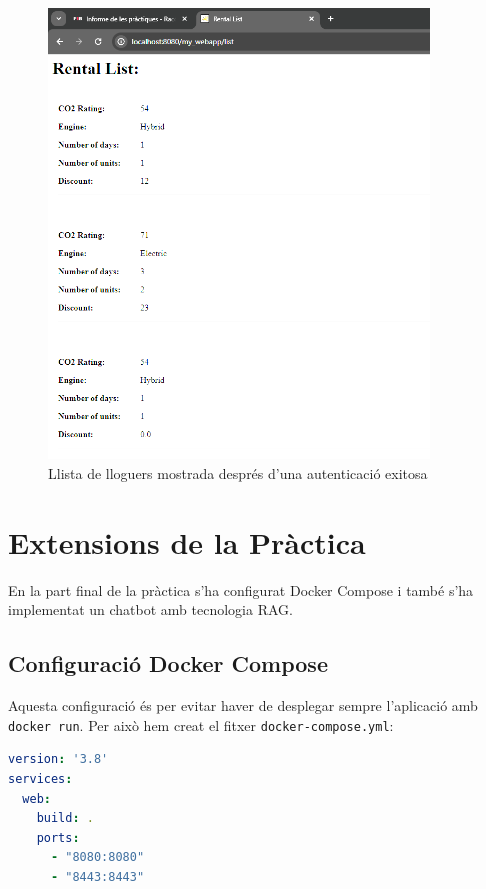 \documentclass[12pt,a4paper]{article}
\begin{document}
\begin{figure}[H]
\centering
\includegraphics[width=0.9\textwidth]{img/rental_list.png}
\caption{Llista de lloguers mostrada després d'una autenticació exitosa}
\end{figure}

\newpage
\section{Extensions de la Pràctica}

En la part final de la pràctica s'ha configurat Docker Compose i també s'ha implementat un chatbot amb tecnologia RAG.

\subsection{Configuració Docker Compose}

Aquesta configuració és per evitar haver de desplegar sempre l'aplicació amb \texttt{docker run}. Per això hem creat el fitxer \texttt{docker-compose.yml}:

\begin{lstlisting}[language=YAML,caption=Configuració Docker Compose]
version: '3.8'
services:
  web:
    build: .
    ports:
      - "8080:8080"
      - "8443:8443"
\end{lstlisting}
\end{document}
